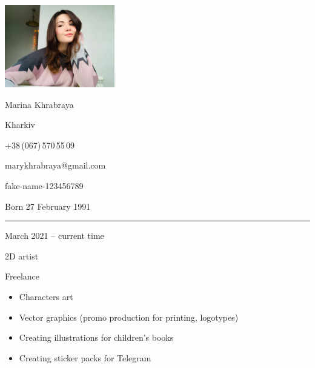 \documentclass[a4paper,10pt]{article}
\newlength{\cvcolumngapwidth}
\newlength{\cvleftcolumnwidth}
\newlength{\cvrightcolumnwidth}
\newcommand{\cvnamestyle}[1]{{\Large\cvnamefont\textcolor{cvnamecolor}{#1}}}
\newcommand{\cvsectionstyle}[1]{{\normalsize\cvsectionfont\textcolor{cvsectioncolor}{#1}}}
\newcommand{\cvtitlestyle}[1]{{\large\cvtitlefont\textcolor{cvtitlecolor}{#1}}}
\newcommand{\cvdurationstyle}[1]{{\small\cvdurationfont\textcolor{cvdurationcolor}{#1}}}
\newlength{\cvafteritemskipamount}
\newlength{\cvaftersectionskipamount}
\newlength{\cvafternameskipamount}
\newlength{\cvafterpersonalinfolineskipamount}
\newlength{\cvaftertitleskipamount}
\newlength{\cvparskip}
\newcommand{\cvpersonalinfo}[2]{
    \begin{minipage}[t]{\cvleftcolumnwidth}
        \vspace{0mm} %
        \raggedleft #1
    \end{minipage}%
    \hspace{\cvcolumngapwidth}%
    \begin{minipage}[t]{\cvrightcolumnwidth}
        \vspace{0mm} %
        #2
    \end{minipage}

    \vspace{\cvafteritemskipamount}
}
\newcommand{\cvname}[1]{
    \cvnamestyle{#1}

    \vspace{\cvafternameskipamount}
}
\newcommand{\cvpersonalinfolinewithicon}[3]{
    \raisebox{.5\fontcharht\font`E-.5\height}{\texttt{[image: \#2]}}
    #3

    \vspace{\cvafterpersonalinfolineskipamount}
}
\newcommand{\cvsection}[1]{
    \begin{minipage}[t]{\cvleftcolumnwidth}
        \raggedleft\cvsectionstyle{#1}
    \end{minipage}%
    \hspace{\cvcolumngapwidth}%
    \begin{minipage}[t]{\cvrightcolumnwidth}
        \textcolor{cvrulecolor}{\rule{\cvrightcolumnwidth}{0.3mm}}
    \end{minipage}

    \vspace{\cvaftersectionskipamount}
}
\newcommand{\cvitem}[2]{
    \begin{minipage}[t]{\cvleftcolumnwidth}
        \raggedleft #1
    \end{minipage}%
    \hspace{\cvcolumngapwidth}%
    \begin{minipage}[t]{\cvrightcolumnwidth}
        \setlength{\parskip}{\cvparskip} #2
    \end{minipage}

    \vspace{\cvafteritemskipamount}
}
\newcommand{\cvtitle}[1]{
    \cvtitlestyle{#1}

    \vspace{\cvaftertitleskipamount}
    \vspace{-\cvparskip}
}
\begin{document}

\cvpersonalinfo{
    \includegraphics[height=36mm]{resources/photo.jpg}
}{
    \cvname{Marina Khrabraya}

    \cvpersonalinfolinewithicon{height=4mm}{resources/IcoMoon-Free-PDF/072-location.pdf}{
        Kharkiv
    }

    \cvpersonalinfolinewithicon{height=4mm}{resources/IcoMoon-Free-PDF/067-phone.pdf}{
        +38\,(067)\,570\,55\,09
    }

    \cvpersonalinfolinewithicon{height=4mm}{resources/IcoMoon-Free-PDF/070-envelop.pdf}{
       marykhrabraya@gmail.com
    }

    \cvpersonalinfolinewithicon{height=4mm}{resources/IcoMoon-Free-PDF/458-linkedin.pdf}{
        fake-name-123456789
    }

    Born 27 February 1991
}



\cvsection{WORK EXPERIENCE}

\cvitem{
    \cvdurationstyle{March 2021 -- current time}
}{
    \cvtitle{2D artist}

    Freelance

    \begin{itemize}[leftmargin=*]
        \item Characters art
        \item Vector graphics (promo production for printing, logotypes)
        \item Creating illustrations for children's books 
        \item Creating sticker packs for Telegram
    \end{itemize}
}
\end{document}
